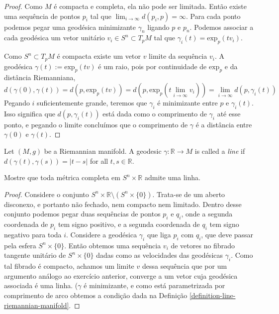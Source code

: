 \begin{proof}
Como $M$ é compacta e completa, ela não pode ser limitada. Então
existe uma sequência de pontos $p_i$  tal que $\lim_{i \to \infty}
d(p_i,p)=\infty$. Para cada ponto podemos pegar uma geodésica minimizante
$\gamma_n$ ligando $p$ e $p_n$. Podemos associar a cada geodésica um vetor
unitário $v_i \in S^n \subset T_pM$ tal que $\gamma_i(t)=\text{exp}_p(tv_i)$.

Como $S^n \subset T_pM$ é compacta existe um vetor $v$ limite da sequência
$v_i$. A geodésica $\gamma(t):=\text{exp}_p(tv)$ é um raio, pois por
continuidade de $\text{exp}_p$ e da distância Riemanniana,
$$
d(\gamma(0),\gamma(t))=d\left(p,\text{exp}_p(tv)\right)
=d\left(p,\text{exp}_p\left(t\lim_{i \to \infty} v_i\right)\right)
=\lim_{i \to \infty} d(p,\gamma_i (t))
$$
Pegando $i$ suficientemente grande, teremos que $\gamma_i$ é minimizante entre
$p$ e $\gamma_i(t)$. Isso significa que $d(p,\gamma_i(t))$ está dada como o
comprimento de $\gamma_i$ até esse ponto, e pegando o limite concluímos que o
comprimento de $\gamma$ é a distância entre $\gamma(0)$ e $\gamma(t)$.
\end{proof}

\begin{definition}
\label{definition-line-riemannian-manifold}
Let $(M,g)$ be a Riemannian manifold. A geodesic $\gamma:\mathbb{R} \to M$ is
called a {\it line} if $d(\gamma(t),\gamma(s))=|t-s|$ for all $t,s \in
\mathbb{R}$.
\end{definition}

\begin{exercise}
\label{exercise-l5-6}
Mostre que toda métrica completa em $S^n \times \mathbb{R}$ admite uma linha.
\end{exercise}

\begin{proof}
Considere o conjunto $S^n\times \mathbb{R}\setminus(S^n \times\{0\})$.
Trata-se de um aberto disconexo, e portanto não fechado, nem compacto nem
limitado.  Dentro desse conjunto podemos pegar duas sequências de pontos $p_i$ e
$q_i$, onde a segunda coordenada de $p_i$ tem signo positivo, e a segunda
coordenada de $q_i$ tem  signo negativo para toda $i$. Considere a geodésica
$\gamma_i$ que liga $p_i$ com $q_i$, que deve passar pela esfera $S^n\times
\{0\}$. Então obtemos uma sequência $v_i$ de vetores no fibrado tangente
unitário de $S^n\times\{0\}$ dadas como as velocidades das geodésicas
$\gamma_i$. Como tal fibrado é compacto, achamos um limite $v$ dessa sequência
que por um argumento análogo ao exercício anterior, converge a um vetor cuja
geodésica associada é uma linha. ($\gamma$ é minimizante, e como está
parametrizada por comprimento de arco obtemos a condição dada na Definição
\ref{definition-line-riemannian-manifold}.
\end{proof}

